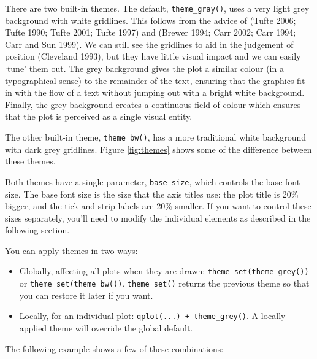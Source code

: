 
There are two built-in themes.  The default,
\texttt{theme\_gray()}, uses a very light grey background with white
gridlines. This follows from the advice of (Tufte 2006; Tufte 1990;
Tufte 2001; Tufte 1997) and (Brewer 1994; Carr 2002; Carr 1994; Carr and
Sun 1999). We can still see the gridlines to aid in the judgement of
position (Cleveland 1993), but they have little visual impact and we can
easily `tune' them out. The grey background gives the plot a similar
colour (in a typographical sense) to the remainder of the text, ensuring
that the graphics fit in with the flow of a text without jumping out
with a bright white background. Finally, the grey background creates a
continuous field of colour which ensures that the plot is perceived as a
single visual entity. 

The other built-in theme, \texttt{theme\_bw()}, has a more traditional
white background with dark grey gridlines. Figure \ref{fig:themes} shows
some of the difference between these themes. 
 

Both themes have a single parameter, \texttt{base\_size}, which controls
the base font size. The base font size is the size that the axis titles
use: the plot title is 20\% bigger, and the tick and strip labels are
20\% smaller. If you want to control these sizes separately, you'll need
to modify the individual elements as described in the following section.

You can apply themes in two ways:

\begin{itemize}
\itemsep1pt\parskip0pt
\item
  Globally, affecting all plots when they are drawn:
  \texttt{theme\_set(theme\_grey())} or
  \texttt{theme\_set(theme\_bw())}. \texttt{theme\_set()} returns the
  previous theme so that you can restore it later if you want.
\item
  Locally, for an individual plot: \texttt{qplot(...) + theme\_grey()}.
  A locally applied theme will override the global default.
\end{itemize}

The following example shows a few of these combinations:

